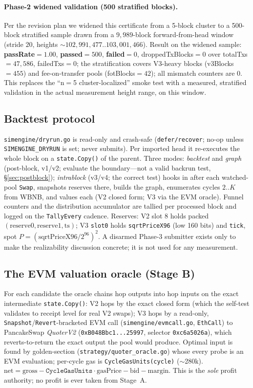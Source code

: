 \documentclass[11pt]{article}
\newcommand{\code}[1]{\texttt{#1}}
\begin{document}
\paragraph{Phase-2 widened validation (500 stratified blocks).} Per the revision plan
we widened this certificate from a 5-block cluster to a 500-block stratified sample
drawn from a $9{,}989$-block forward-from-head window (stride $20$, heights
$\sim$$102{,}991{,}477..103{,}001{,}466$). Result on the widened sample:
\textbf{passRate}$=1.00$, \textbf{passed}$=500$, \textbf{failed}$=0$, droppedTxBlocks$=0$
over totalTxs$=47{,}586$, failedTxs$=0$; the stratification covers V3-heavy blocks
(v3Blocks$=455$) and fee-on-transfer pools (fotBlocks$=42$); all mismatch counters are
$0$. This replaces the ``n$=$5 cluster-localized'' smoke test with a measured,
stratified validation in the actual measurement height range, on this window.

\subsection{Backtest protocol}
\code{simengine/dryrun.go} is read-only and crash-safe (\code{defer/recover};
no-op unless \code{SIMENGINE\_DRYRUN} is set; never submits). Per imported head it
re-executes the whole block on a \code{state.Copy()} of the parent. Three modes:
\emph{backtest} and \emph{graph} (post-block, v1/v2; evaluate the boundary---not a
valid backrun test, \S\ref{sec:postblock}); \emph{intrablock} (v3/v4; the correct
test) hooks in after each watched-pool \code{Swap}, snapshots reserves there, builds
the graph, enumerates cycles $2..K$ from WBNB, and values each (V2 closed form; V3
via the EVM oracle). Funnel counters and the distribution accumulator are tallied
per processed block and logged on the \code{TallyEvery} cadence. Reserves: V2 slot 8
holds packed $(\text{reserve0},\text{reserve1},\text{ts})$; V3 \code{slot0} holds
\code{sqrtPriceX96} (low 160 bits) and \code{tick}, spot $P=(\text{sqrtPriceX96}/2^{96})^2$.
A disarmed Phase-3 submitter exists only to make the realizability discussion
concrete; it is not used for any measurement.

\subsection{The EVM valuation oracle (Stage B)}
\label{sec:oracle}
For each candidate the oracle chains hop outputs into hop inputs on the exact
intermediate \code{state.Copy()}: V2 hops by the exact closed form (which the
self-test validates to receipt level for real V2 swaps); V3 hops by a read-only,
\code{Snapshot}/\code{Revert}-bracketed EVM call (\code{simengine/evmcall.go},
\code{EthCall}) to PancakeSwap \emph{QuoterV2}
(\code{0xB048Bbc1...25997}, selector \code{0xc6a5026a}), which reverts-to-return the
exact output the pool would produce. Optimal input is found by golden-section
(\code{strategy/quoter\_oracle.go}) whose every probe is an EVM evaluation;
per-cycle gas is \code{CycleGasUnits(cycle)} ($\sim$280k). $\text{net}=\text{gross}-
\code{CycleGasUnits}\cdot\text{gasPrice}-\text{bid}-\text{margin}$. This is the
\emph{sole} profit authority; no profit is ever taken from Stage~A.
\end{document}
